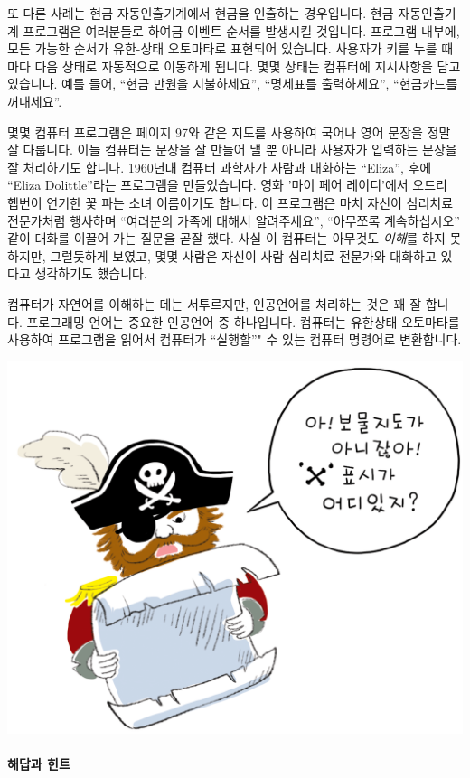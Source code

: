 \documentclass[]{article}
\begin{document}
또 다른 사례는 현금 자동인출기계에서 현금을 인출하는 경우입니다. 현금
자동인출기계 프로그램은 여러분들로 하여금 이벤트 순서를 발생시킬
것입니다. 프로그램 내부에, 모든 가능한 순서가 유한-상태 오토마타로
표현되어 있습니다. 사용자가 키를 누를 때마다 다음 상태로 자동적으로
이동하게 됩니다. 몇몇 상태는 컴퓨터에 지시사항을 담고 있습니다. 예를
들어, ``현금 만원을 지불하세요'', ``명세표를 출력하세요'', ``현금카드를
꺼내세요''.

몇몇 컴퓨터 프로그램은 페이지 97와 같은 지도를 사용하여 국어나 영어
문장을 정말 잘 다룹니다. 이들 컴퓨터는 문장을 잘 만들어 낼 뿐 아니라
사용자가 입력하는 문장을 잘 처리하기도 합니다. 1960년대 컴퓨터 과학자가
사람과 대화하는 ``Eliza'', 후에 ``Eliza Dolittle''라는 프로그램을
만들었습니다. 영화 '마이 페어 레이디'에서 오드리 헵번이 연기한 꽃 파는
소녀 이름이기도 합니다. 이 프로그램은 마치 자신이 심리치료 전문가처럼
행사하며 ``여러분의 가족에 대해서 알려주세요'', ``아무쪼록
계속하십시오'' 같이 대화를 이끌어 가는 질문을 곧잘 했다. 사실 이
컴퓨터는 아무것도 \emph{이해}를 하지 못하지만, 그럴듯하게 보였고, 몇몇
사람은 자신이 사람 심리치료 전문가와 대화하고 있다고 생각하기도
했습니다.

컴퓨터가 자연어를 이해하는 데는 서투르지만, 인공언어를 처리하는 것은 꽤
잘 합니다. 프로그래밍 언어는 중요한 인공언어 중 하나입니다. 컴퓨터는
유한상태 오토마타를 사용하여 프로그램을 읽어서 컴퓨터가 ``실행할''" 수
있는 컴퓨터 명령어로 변환합니다.

\includegraphics{csunplugged/03-part/img/ch12-fsm/11-fsm-07-pirate.png}

\mbox{}\paragraph{해답과 힌트}\label{section-170}
\end{document}
